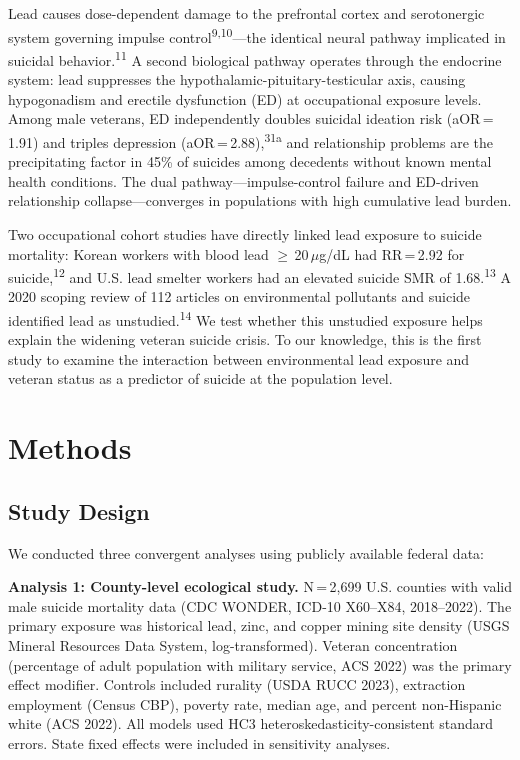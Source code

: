\documentclass[11pt,twocolumn]{article}
\begin{document}
Lead causes dose-dependent damage to the prefrontal cortex and serotonergic system governing impulse control\textsuperscript{9,10}---the identical neural pathway implicated in suicidal behavior.\textsuperscript{11} A second biological pathway operates through the endocrine system: lead suppresses the hypothalamic-pituitary-testicular axis, causing hypogonadism and erectile dysfunction (ED) at occupational exposure levels. Among male veterans, ED independently doubles suicidal ideation risk (aOR\,=\,1.91) and triples depression (aOR\,=\,2.88),\textsuperscript{31a} and relationship problems are the precipitating factor in 45\% of suicides among decedents without known mental health conditions. The dual pathway---impulse-control failure and ED-driven relationship collapse---converges in populations with high cumulative lead burden.

Two occupational cohort studies have directly linked lead exposure to suicide mortality: Korean workers with blood lead $\geq$\,20\,$\mu$g/dL had RR\,=\,2.92 for suicide,\textsuperscript{12} and U.S. lead smelter workers had an elevated suicide SMR of 1.68.\textsuperscript{13} A 2020 scoping review of 112 articles on environmental pollutants and suicide identified lead as unstudied.\textsuperscript{14} We test whether this unstudied exposure helps explain the widening veteran suicide crisis. To our knowledge, this is the first study to examine the interaction between environmental lead exposure and veteran status as a predictor of suicide at the population level.


\section{Methods}

\subsection{Study Design}

We conducted three convergent analyses using publicly available federal data:

\textbf{Analysis 1: County-level ecological study.} N\,=\,2,699 U.S. counties with valid male suicide mortality data (CDC WONDER, ICD-10 X60--X84, 2018--2022). The primary exposure was historical lead, zinc, and copper mining site density (USGS Mineral Resources Data System, log-transformed). Veteran concentration (percentage of adult population with military service, ACS 2022) was the primary effect modifier. Controls included rurality (USDA RUCC 2023), extraction employment (Census CBP), poverty rate, median age, and percent non-Hispanic white (ACS 2022). All models used HC3 heteroskedasticity-consistent standard errors. State fixed effects were included in sensitivity analyses.
\end{document}
